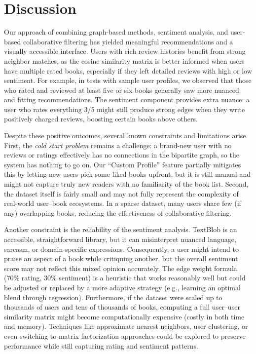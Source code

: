 \documentclass[12pt]{article}
\begin{document}
\section{Discussion}

Our approach of combining graph-based methods, sentiment analysis, and user-based collaborative filtering has yielded meaningful recommendations and a visually accessible interface. Users with rich review histories benefit from strong neighbor matches, as the cosine similarity matrix is better informed when users have multiple rated books, especially if they left detailed reviews with high or low sentiment. For example, in tests with sample user profiles, we observed that those who rated and reviewed at least five or six books generally saw more nuanced and fitting recommendations. The sentiment component provides extra nuance: a user who rates everything 3/5 might still produce strong edges when they write positively charged reviews, boosting certain books above others.

Despite these positive outcomes, several known constraints and limitations arise. First, the \textit{cold start problem} remains a challenge: a brand-new user with no reviews or ratings effectively has no connections in the bipartite graph, so the system has nothing to go on. Our “Custom Profile” feature partially mitigates this by letting new users pick some liked books upfront, but it is still manual and might not capture truly new readers with no familiarity of the book list. Second, the dataset itself is fairly small and may not fully represent the complexity of real-world user–book ecosystems. In a sparse dataset, many users share few (if any) overlapping books, reducing the effectiveness of collaborative filtering.

Another constraint is the reliability of the sentiment analysis. TextBlob is an accessible, straightforward library, but it can misinterpret nuanced language, sarcasm, or domain-specific expressions. Consequently, a user might intend to praise an aspect of a book while critiquing another, but the overall sentiment score may not reflect this mixed opinion accurately. The edge weight formula (70\% rating, 30\% sentiment) is a heuristic that works reasonably well but could be adjusted or replaced by a more adaptive strategy (e.g., learning an optimal blend through regression). Furthermore, if the dataset were scaled up to thousands of users and tens of thousands of books, computing a full user–user similarity matrix might become computationally expensive (costly in both time and memory). Techniques like approximate nearest neighbors, user clustering, or even switching to matrix factorization approaches could be explored to preserve performance while still capturing rating and sentiment patterns.
\end{document}
